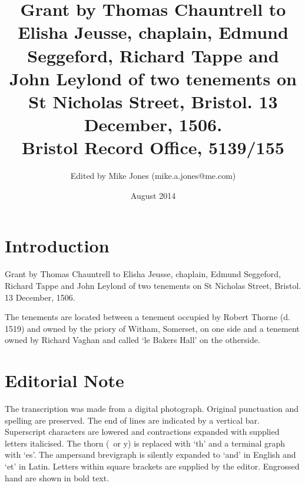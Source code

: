 \documentclass[a4paper,12pt]{article}
\makeatletter
\def\authorname{Mike Jones}
\def\authoremail{mike.a.jones@me.com}
\def\shorttitle{Grant by Thomas Chauntrell to Elisha Jeusse, chaplain, Edmund Seggeford, Richard Tappe and John Leylond of two tenements on St Nicholas Street, Bristol. 13 December, 1506.}
\def\abstract{Grant by Thomas Chauntrell to Elisha Jeusse, chaplain, Edmund Seggeford, Richard Tappe and John Leylond of two tenements on St Nicholas Street, Bristol. 13 December, 1506.}
\def\pubdate{August 2014}
\def\archivename{Bristol Record Office}
\def\archiverefno{5139/155}
\makeatother
\begin{document}
\title{\Large \shorttitle\\\normalsize \vspace{1em} \archivename \hspace{0 mm}, \archiverefno \hspace{1 mm}}\vspace{-5em}
\author{\small Edited by \authorname \hspace{0 mm} (\authoremail)}
\date{\small \pubdate}
\maketitle

\section*{Introduction}
\abstract

The tenements are located between a tenement occupied by Robert Thorne (d. 1519) and owned by the priory of Witham, Somerset, on one side and a tenement owned by Richard Vaghan and called `le Bakers Hall' on the otherside.

\section*{Editorial Note}

The transcription was made from a digital photograph. Original punctuation and spelling are preserved. The end of lines are indicated by a vertical bar. Superscript characters are lowered and contractions expanded with supplied letters italicised. The thorn (\th\ or y) is replaced with `th' and a terminal graph with `es'. The ampersand brevigraph is silently expanded to `and' in English and `et' in Latin. Letters within square brackets are supplied by the editor. Engrossed hand are shown in bold text.
\end{document}
